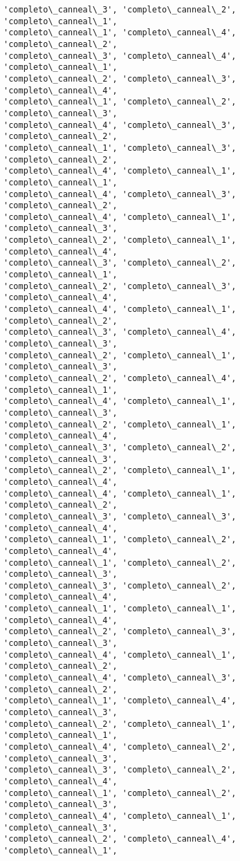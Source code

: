 \documentclass[11pt]{article}
\begin{document}
\begin{Verbatim}[commandchars=\\\{\}]
'completo\_canneal\_3', 'completo\_canneal\_2', 'completo\_canneal\_1',
'completo\_canneal\_1', 'completo\_canneal\_4', 'completo\_canneal\_2',
'completo\_canneal\_3', 'completo\_canneal\_4', 'completo\_canneal\_1',
'completo\_canneal\_2', 'completo\_canneal\_3', 'completo\_canneal\_4',
'completo\_canneal\_1', 'completo\_canneal\_2', 'completo\_canneal\_3',
'completo\_canneal\_4', 'completo\_canneal\_3', 'completo\_canneal\_2',
'completo\_canneal\_1', 'completo\_canneal\_3', 'completo\_canneal\_2',
'completo\_canneal\_4', 'completo\_canneal\_1', 'completo\_canneal\_1',
'completo\_canneal\_4', 'completo\_canneal\_3', 'completo\_canneal\_2',
'completo\_canneal\_4', 'completo\_canneal\_1', 'completo\_canneal\_3',
'completo\_canneal\_2', 'completo\_canneal\_1', 'completo\_canneal\_4',
'completo\_canneal\_3', 'completo\_canneal\_2', 'completo\_canneal\_1',
'completo\_canneal\_2', 'completo\_canneal\_3', 'completo\_canneal\_4',
'completo\_canneal\_4', 'completo\_canneal\_1', 'completo\_canneal\_2',
'completo\_canneal\_3', 'completo\_canneal\_4', 'completo\_canneal\_3',
'completo\_canneal\_2', 'completo\_canneal\_1', 'completo\_canneal\_3',
'completo\_canneal\_2', 'completo\_canneal\_4', 'completo\_canneal\_1',
'completo\_canneal\_4', 'completo\_canneal\_1', 'completo\_canneal\_3',
'completo\_canneal\_2', 'completo\_canneal\_1', 'completo\_canneal\_4',
'completo\_canneal\_3', 'completo\_canneal\_2', 'completo\_canneal\_3',
'completo\_canneal\_2', 'completo\_canneal\_1', 'completo\_canneal\_4',
'completo\_canneal\_4', 'completo\_canneal\_1', 'completo\_canneal\_2',
'completo\_canneal\_3', 'completo\_canneal\_3', 'completo\_canneal\_4',
'completo\_canneal\_1', 'completo\_canneal\_2', 'completo\_canneal\_4',
'completo\_canneal\_1', 'completo\_canneal\_2', 'completo\_canneal\_3',
'completo\_canneal\_3', 'completo\_canneal\_2', 'completo\_canneal\_4',
'completo\_canneal\_1', 'completo\_canneal\_1', 'completo\_canneal\_4',
'completo\_canneal\_2', 'completo\_canneal\_3', 'completo\_canneal\_3',
'completo\_canneal\_4', 'completo\_canneal\_1', 'completo\_canneal\_2',
'completo\_canneal\_4', 'completo\_canneal\_3', 'completo\_canneal\_2',
'completo\_canneal\_1', 'completo\_canneal\_4', 'completo\_canneal\_3',
'completo\_canneal\_2', 'completo\_canneal\_1', 'completo\_canneal\_1',
'completo\_canneal\_4', 'completo\_canneal\_2', 'completo\_canneal\_3',
'completo\_canneal\_3', 'completo\_canneal\_2', 'completo\_canneal\_4',
'completo\_canneal\_1', 'completo\_canneal\_2', 'completo\_canneal\_3',
'completo\_canneal\_4', 'completo\_canneal\_1', 'completo\_canneal\_3',
'completo\_canneal\_2', 'completo\_canneal\_4', 'completo\_canneal\_1',

\end{Verbatim}
\end{document}
